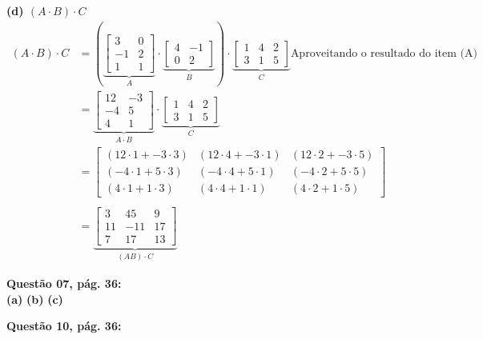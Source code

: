 \documentclass[a4paper,12pt]{article}
\begin{document}
\textbf{(d) $(A\cdot B)\cdot C$}
\begin{align*}
    (A\cdot B)\cdot C &=( 
    \underbrace{
    \begin{bmatrix}
        3 & 0\\
        -1 & 2\\
        1 & 1
    \end{bmatrix}}_{A} 
    \cdot
    \underbrace{
    \begin{bmatrix}
        4 & -1\\
        0 & 2
    \end{bmatrix}}_{B})
    \cdot
    \underbrace{
    \begin{bmatrix}
        1 & 4 & 2\\
        3 & 1 & 5
    \end{bmatrix}}_{C}
    \textrm{Aproveitando o resultado do item (A)} \\
    &=
    \underbrace{
    \begin{bmatrix}
        12 & -3\\
        -4 & 5 \\
        4 & 1
    \end{bmatrix}}_{A \cdot B}
    \cdot
    \underbrace{
    \begin{bmatrix}
        1 & 4 & 2\\
        3 & 1 & 5
    \end{bmatrix}}_{C} \\
    &=
    \begin{bmatrix}
        (12 \cdot 1 + -3 \cdot 3) & (12 \cdot 4 + -3 \cdot 1) & (12 \cdot 2 + -3 \cdot 5)\\
        (-4 \cdot 1 + 5 \cdot 3) & (-4 \cdot 4 + 5 \cdot 1) & (-4 \cdot 2 + 5 \cdot 5)\\
        (4 \cdot 1 + 1 \cdot 3) & (4 \cdot 4 + 1 \cdot 1) & (4 \cdot 2 + 1 \cdot 5)
    \end{bmatrix} \\ \\
    &=
    \underbrace{
    \begin{bmatrix}
        3 & 45 & 9 \\
        11 & -11 & 17 \\
        7 & 17 & 13
    \end{bmatrix}}_{(AB) \cdot C}
\end{align*}


\textbf{Questão 07, pág. 36:}\\
\textbf{(a)}
\textbf{(b)}
\textbf{(c)}

\textbf{Questão 10, pág. 36:}\\
\end{document}
